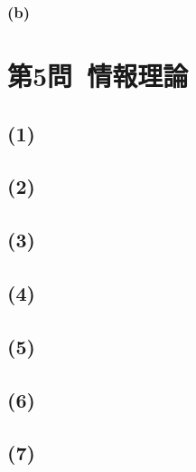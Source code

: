 \documentclass[a4paper,12pt,xelatex,ja=standard]{bxjsarticle}
\begin{document}
    \subsubsection*{(b)}

\section*{第5問\ 情報理論}
  \subsection*{(1)}
  \subsection*{(2)}
  \subsection*{(3)}
  \subsection*{(4)}
  \subsection*{(5)}
  \subsection*{(6)}
  \subsection*{(7)}
\end{document}
